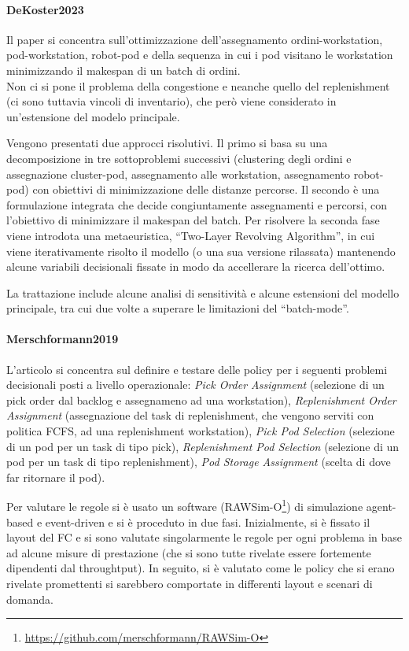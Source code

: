 \documentclass{article}
\begin{document}
\paragraph{DeKoster2023 \cite{DeKoster2023}}
Il paper si concentra sull'ottimizzazione dell'assegnamento ordini-workstation, pod-workstation, robot-pod e della sequenza in cui i pod visitano le workstation minimizzando il makespan di un batch di ordini. \\
Non ci si pone il problema della congestione e neanche quello del replenishment (ci sono tuttavia vincoli di inventario), che però viene considerato in un'estensione del modelo principale.

Vengono presentati due approcci risolutivi.
Il primo si basa su una decomposizione in tre sottoproblemi successivi (clustering degli ordini e assegnazione cluster-pod, assegnamento alle workstation, assegnamento robot-pod) con obiettivi di minimizzazione delle distanze percorse. Il secondo è una formulazione integrata che decide congiuntamente assegnamenti e percorsi, con l'obiettivo di minimizzare il makespan del batch.
Per risolvere la seconda fase viene introdota una metaeuristica, \enquote{Two-Layer Revolving Algorithm}, in cui viene iterativamente risolto il modello (o una sua versione rilassata) mantenendo alcune variabili decisionali fissate in modo da accellerare la ricerca dell'ottimo.

La trattazione include alcune analisi di sensitività e alcune estensioni del modello principale, tra cui due volte a superare le limitazioni del \enquote{batch-mode}.



\paragraph{Merschformann2019 \cite{Merschformann2019}}
L'articolo si concentra sul definire e testare delle policy per i seguenti problemi decisionali posti a livello operazionale: \emph{Pick Order Assignment} (selezione di un pick order dal backlog e assegnameno ad una workstation), \emph{Replenishment Order Assignment} (assegnazione del task di replenishment, che vengono serviti con politica FCFS, ad una replenishment workstation), \emph{Pick Pod Selection} (selezione di un pod per un task di tipo pick), \emph{Replenishment Pod Selection} (selezione di un pod per un task di tipo replenishment), \emph{Pod Storage Assignment} (scelta di dove far ritornare il pod).

Per valutare le regole si è usato un software (RAWSim-O\footnote{\url{https://github.com/merschformann/RAWSim-O}}) di simulazione agent-based e event-driven e si è proceduto in due fasi.
Inizialmente, si è fissato il layout del FC e si sono valutate singolarmente le regole per ogni problema in base ad alcune misure di prestazione (che si sono tutte rivelate essere fortemente dipendenti dal throughtput). In seguito, si è valutato come le policy che si erano rivelate promettenti si sarebbero comportate in differenti layout e scenari di domanda.
\end{document}
